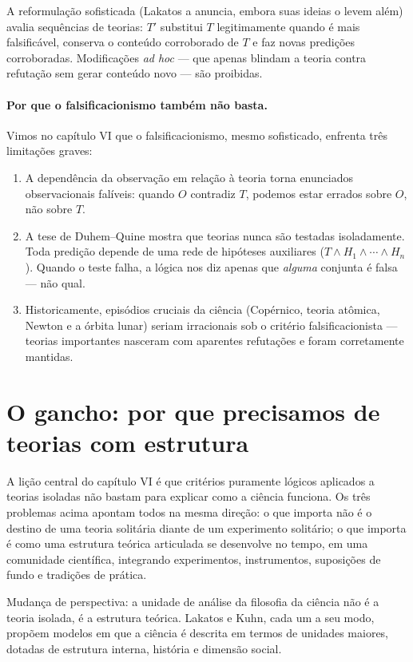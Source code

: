 \documentclass[9pt,a4paper]{extarticle}
\newcommand{\impt}[1]{\textcolor{important}{#1}}
\newcommand{\ntc}[1]{\textcolor{notice}{#1}}
\theoremstyle{definition}
\begin{document}
A reformulação \impt{sofisticada} (Lakatos a anuncia, embora suas ideias o levem além) avalia \impt{sequências de teorias}: $T'$ substitui $T$ legitimamente quando é mais falsificável, conserva o conteúdo corroborado de $T$ e faz novas predições corroboradas. Modificações \emph{ad hoc} --- que apenas blindam a teoria contra refutação sem gerar conteúdo novo --- são proibidas.

\paragraph{Por que o falsificacionismo também não basta.}
Vimos no capítulo VI que o falsificacionismo, mesmo sofisticado, enfrenta três limitações graves:

\begin{enumerate}
  \item A \impt{dependência da observação em relação à teoria} torna enunciados observacionais falíveis: quando $O$ contradiz $T$, podemos estar errados sobre $O$, não sobre $T$.
  \item A \impt{tese de Duhem--Quine} mostra que teorias nunca são testadas isoladamente. Toda predição depende de uma rede de hipóteses auxiliares ($T \wedge H_1 \wedge \cdots \wedge H_n$). Quando o teste falha, a lógica nos diz apenas que \emph{alguma} conjunta é falsa --- não qual.
  \item Historicamente, episódios cruciais da ciência (Copérnico, teoria atômica, Newton e a órbita lunar) seriam \impt{irracionais} sob o critério falsificacionista --- teorias importantes nasceram com aparentes refutações e foram corretamente mantidas.
\end{enumerate}

\section{O gancho: por que precisamos de teorias com estrutura}

A lição central do capítulo VI é que critérios \impt{puramente lógicos} aplicados a \impt{teorias isoladas} não bastam para explicar como a ciência funciona. Os três problemas acima apontam todos na mesma direção: o que importa não é o destino de uma teoria solitária diante de um experimento solitário; o que importa é como uma \impt{estrutura teórica articulada} se desenvolve no tempo, em uma comunidade científica, integrando experimentos, instrumentos, suposições de fundo e tradições de prática.

\ntc{Mudança de perspectiva:} a unidade de análise da filosofia da ciência \impt{não é a teoria isolada, é a estrutura teórica}. Lakatos e Kuhn, cada um a seu modo, propõem modelos em que a ciência é descrita em termos de unidades maiores, dotadas de \impt{estrutura interna}, \impt{história} e \impt{dimensão social}.
\end{document}
